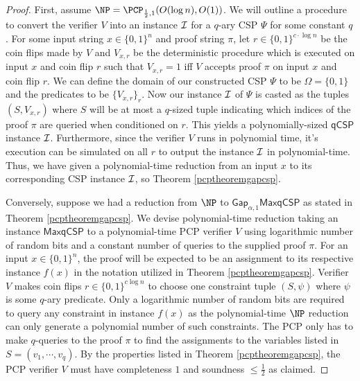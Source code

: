 \begin{proof}
First, assume $\NP = \PCP_{\frac{1}{2},1}(O(\log{n}), O(1))$. We will outline a procedure to convert the verifier $V$ into an instance $\mathcal{I}$ for a $q$-ary CSP $\Psi$ for some constant $q$. For some input string $x \in \{0,1\}^n$ and proof string $\pi$, let $r \in \{0,1\}^{c \cdot \log{n}}$ be the coin flips made by $V$ and $V_{x,r}$ be the deterministic procedure which is executed on input $x$ and coin flip $r$ such that $V_{x,r} = 1$ iff $V$ accepts proof $\pi$ on input $x$ and coin flip $r$. We can define the domain of our constructed CSP $\Psi$ to be $\Omega=\{0,1\}$ and the predicates to be $\{V_{x,r}\}_{r}$. Now our instance $\mathcal{I}$ of $\Psi$ is casted as the tuples $(S, V_{x,r})$ where $S$ will be at most a $q$-sized tuple indicating which indices of the proof $\pi$ are queried when conditioned on $r$. This yields a polynomially-sized $\mathsf{qCSP}$ instance $\mathcal{I}$. Furthermore, since the verifier $V$ runs in polynomial time, it's execution can be simulated on all $r$ to output the instance $\mathcal{I}$ in polynomial-time. Thus, we have given a polynomial-time reduction from an input $x$ to its corresponding CSP instance $\mathcal{I}$, so Theorem \ref{pcptheoremgapcsp}. \newline

Conversely, suppose we had a reduction from $\NP$ to $\mathsf{Gap}_{\alpha,1}\mathsf{MaxqCSP}$ as stated in Theorem \ref{pcptheoremgapcsp}. We devise polynomial-time reduction taking an instance $\mathsf{MaxqCSP}$ to a polynomial-time PCP verifier $V$ using logarithmic number of random bits and a constant number of queries to the supplied proof $\pi$. For an input $x \in \{0,1\}^n$, the proof will be expected to be an assignment to its respective instance $f(x)$ in the notation utilized in Theorem \ref{pcptheoremgapcsp}. Verifier $V$ makes coin flips $r \in \{0,1\}^{c\log{n}}$ to choose one constraint tuple $(S,\psi)$ where $\psi$ is some $q$-ary predicate. Only a logarithmic number of random bits are required to query any constraint in instance $f(x)$ as the polynomial-time $\NP$ reduction can only generate a polynomial number of such constraints.  The PCP only has to make $q$-queries to the proof $\pi$ to find the assignments to the variables listed in $S = (v_1,\cdots,v_q)$. By the properties listed in Theorem \ref{pcptheoremgapcsp}, the PCP verifier $V$ must have completeness $1$ and soundness $\leq \frac{1}{2}$ as claimed.
\end{proof}

